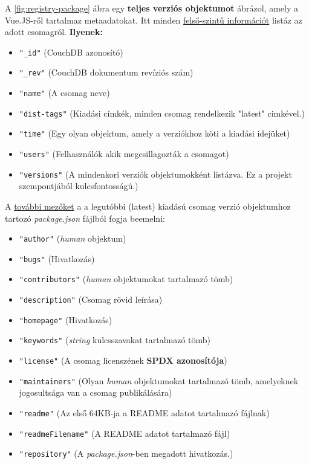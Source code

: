 \pagebreak

A \ref{fig:registry-package} ábra egy \textbf{teljes verziós objektumot} ábrázol, amely a Vue.JS-ről tartalmaz metaadatokat. Itt minden \underline{felső-szintű információt} listáz az adott csomagról. \textbf{Ilyenek:}

\begin{itemize}
	\item \texttt{"\_id"} (CouchDB azonosító)
	\item \texttt{"\_rev"} (CouchDB dokumentum revíziós szám)
	\item \texttt{"name"} (A csomag neve)
	\item \texttt{"dist-tags"} (Kiadási címkék, minden csomag rendelkezik "latest" cimkével.)
	\item \texttt{"time"} (Egy olyan objektum, amely a verziókhoz köti a kiadási idejüket)
	\item \texttt{"users"} (Felhasználók akik megcsillagozták a csomagot)
	\item \texttt{"versions"} (A mindenkori verziók objektumokként listázva. Ez a projekt szempontjából kulcsfontosságú.)
\end{itemize}

A \underline{további mezőket} a a legutóbbi (latest) kiadású csomag verzió objektumhoz tartozó \emph{package.json} fájlból fogja beemelni:

\begin{itemize}
	\item \texttt{"author"} (\emph{human} objektum)
	\item \texttt{"bugs"} (Hivatkozás)
	\item \texttt{"contributors"} (\emph{human} objektumokat tartalmazó tömb)
	\item \texttt{"description"} (Csomag rövid leírása)
	\item \texttt{"homepage"} (Hivatkozás)
	\item \texttt{"keywords"} (\emph{string} kulcsszavakat tartalmazó tömb)
	\item \texttt{"license"} (A csomag licenszének \textbf{SPDX azonosítója})
	\item \texttt{"maintainers"} (Olyan \emph{human} objektumokat tartalmazó tömb, amelyeknek jogosultsága van a csomag publikálására)
	\item \texttt{"readme"} (Az első 64KB-ja a README adatot tartalmazó fájlnak)
	\item \texttt{"readmeFilename"} (A README adatot tartalmazó fájl)
	\item \texttt{"repository"} (A \emph{package.json}-ben megadott hivatkozás.)
\end{itemize}

